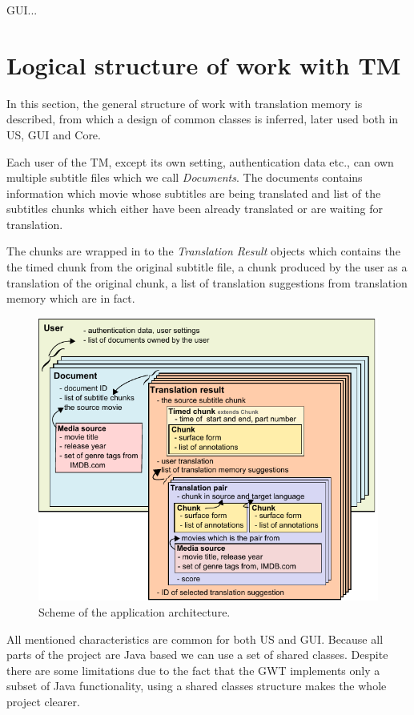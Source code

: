 GUI...

\section{Logical structure of work with TM}

In this section, the general structure of work with translation memory is described, from which a design of common classes is inferred, later used both in US, GUI and Core.

Each user of the TM, except its own setting, authentication data etc., can own multiple subtitle files which we call \emph{Documents}. The documents contains information which movie whose subtitles are being translated and list of the subtitles chunks which either have been already translated or are waiting for translation.

The chunks are wrapped in to the \emph{Translation Result} objects which contains the the timed chunk from the original subtitle file, a chunk produced by the user as a translation of the original chunk, a list of translation suggestions from translation memory which are in fact.

\begin{figure}[h]
\begin{center}
\includegraphics{figures/shared_classes.pdf}
\end{center}
\caption{Scheme of the application architecture.}\label{projectStructure:logical}
\end{figure}

All mentioned characteristics are common for both US and GUI. Because all parts of the project are Java based we can use a set of shared classes. Despite there are some limitations due to the fact that the GWT implements only a subset of Java functionality, using a shared classes structure makes the whole project clearer. 

